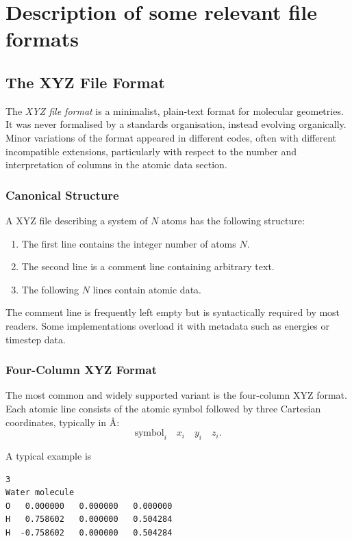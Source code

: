 \chapter{Description of some relevant file formats}
\label{app:files}

\section{The XYZ File Format}

The \emph{XYZ file format} is a minimalist, plain-text format for
molecular geometries. It was never formalised by a standards
organisation, instead evolving organically. Minor variations of the
format appeared in different codes, often with different incompatible
extensions, particularly with respect to the number and interpretation
of columns in the atomic data section.

\subsection{Canonical Structure}

A XYZ file describing a system of $N$ atoms has the following
structure:

\begin{enumerate}
  \item The first line contains the integer number of atoms $N$.
  \item The second line is a comment line containing arbitrary text.
  \item The following $N$ lines contain atomic data.
\end{enumerate}

The comment line is frequently left empty but is syntactically
required by most readers. Some implementations overload it with
metadata such as energies or timestep data.

\subsection{Four-Column XYZ Format}

The most common and widely supported variant is the four-column XYZ
format.  Each atomic line consists of the atomic symbol followed by
three Cartesian coordinates, typically in \AA{}:
\[
\text{symbol}_i \quad x_i \quad y_i \quad z_i.
\]

A typical example is
\begin{verbatim}
3
Water molecule
O   0.000000   0.000000   0.000000
H   0.758602   0.000000   0.504284
H  -0.758602   0.000000   0.504284
\end{verbatim}

